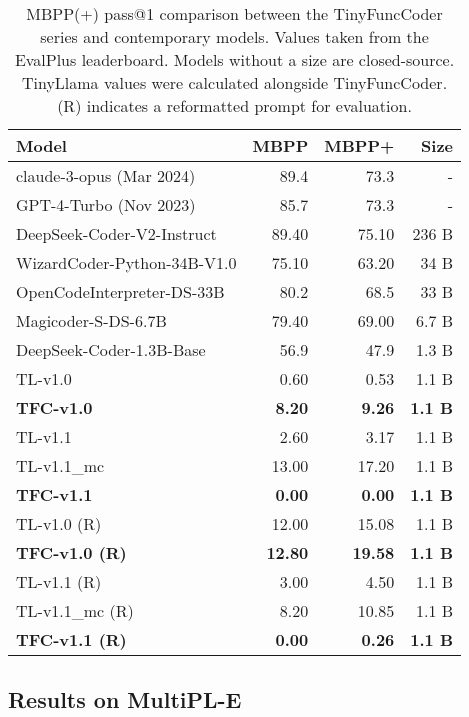\begin{table}[!h]
    \centering
    \caption{MBPP(+) pass@1 comparison between the TinyFuncCoder series and contemporary models. Values taken from the EvalPlus leaderboard. Models without a size are closed-source. TinyLlama values were calculated alongside TinyFuncCoder. (R) indicates a reformatted prompt for evaluation.}
    \begin{tabular}{l|rr|r}
        \hline
        Model & MBPP & MBPP+ & Size \\
        \hline
        claude-3-opus (Mar 2024) & 89.4 & 73.3 & - \\
        GPT-4-Turbo (Nov 2023) & 85.7 & 73.3 & - \\
        \hline
        DeepSeek-Coder-V2-Instruct & 89.40 & 75.10 & 236 B \\
        WizardCoder-Python-34B-V1.0 & 75.10 & 63.20 & 34 B \\
        OpenCodeInterpreter-DS-33B & 80.2 & 68.5 & 33 B \\
        Magicoder-S-DS-6.7B & 79.40 & 69.00 & 6.7 B \\
        DeepSeek-Coder-1.3B-Base & 56.9 & 47.9 & 1.3 B \\
        \hline
        TL-v1.0 & 0.60 & 0.53 & 1.1 B \\
        \textbf{TFC-v1.0} & \textbf{8.20} & \textbf{9.26} & \textbf{1.1 B} \\
        TL-v1.1 & 2.60 & 3.17 & 1.1 B \\
        TL-v1.1\_mc & 13.00 & 17.20 & 1.1 B \\
        \textbf{TFC-v1.1} & \textbf{0.00} & \textbf{0.00} & \textbf{1.1 B} \\
        \hline
        TL-v1.0 (R) & 12.00 & 15.08 & 1.1 B \\
        \textbf{TFC-v1.0 (R)} & \textbf{12.80} & \textbf{19.58} & \textbf{1.1 B} \\
        TL-v1.1 (R) & 3.00 & 4.50 & 1.1 B \\
        TL-v1.1\_mc (R) & 8.20 & 10.85 & 1.1 B \\
        \textbf{TFC-v1.1 (R)} & \textbf{0.00} & \textbf{0.26} & \textbf{1.1 B} \\
        \hline
    \end{tabular}
    \label{tab:mbpp}
\end{table}


\subsection{Results on MultiPL-E}
\label{sec:multipleres}

